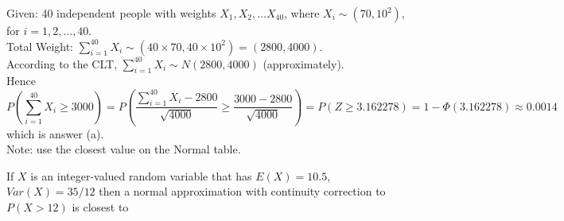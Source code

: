 \documentclass[bigtut]{tutorial}
\begin{document}
\begin{tutorial}
\begin{questions}
\begin{solution}
Given: 40 independent people with weights $X_{1}, X_{2}, \ldots X_{40}$, where $X_{i} \sim (70,10^2)$, for $i=1,2,\ldots,40$.  \\
Total Weight: $\sum_{i=1}^{40} X_{i} \sim (40 \times 70, 40 \times 10^2) = (2800,4000)$. \\
According to the CLT, $\sum_{i=1}^{40} X_{i} \sim N(2800,4000)$ (approximately). \\
Hence
\[ P(\sum_{i=1}^{40} X_{i} \geq 3000) = P( \frac{ \sum_{i=1}^{40} X_{i} - 2800}{\sqrt{4000}} \geq \frac{3000-2800}{\sqrt{4000}}) = P(Z \geq 3.162278) = 1-\Phi(3.162278) \approx 0.0014 \]
which is answer (a). \\

Note: use the closest value on the Normal table.
\end{solution}




\question
If $X$ is an integer-valued random variable that has $E(X) = 10.5$, $Var(X) = 35/12$ then a normal
approximation with continuity correction to $P(X > 12)$ is closest to
\end{questions}
\end{tutorial}
\end{document}
